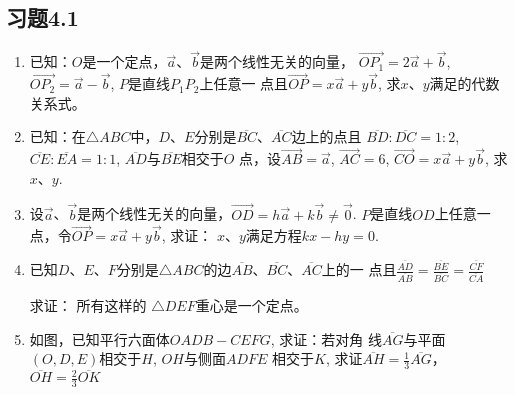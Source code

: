 \subsection*{习题4.1}

\begin{enumerate}
    \item 已知：$O$是一个定点，$\vec{a}$、$\vec{b}$是两个线性无关的向量，
$\Vec{OP_1}=2\vec{a}+\vec{b}$, $\Vec{OP_2}=\vec{a}-\vec{b}$, $P$是直线$P_1P_2$上任意一
    点且$\Vec{OP}=x\vec{a}+y\vec{b}$, 求$x$、$y$满足的代数关系式。
    \item 已知：在$\triangle ABC$中，$D$、$E$分别是$\overline{BC}$、$\overline{AC}$边上的点且
    $\overline{BD}:\overline{DC}=1:2$, $\overline{CE}:\overline{EA}=1:1$, $\overline{AD}$与$\overline{BE}$相交于$O$
    点，设$\Vec{AB}=\vec{a}$, $\Vec{AC}=6$, $\Vec{CO}=x\vec{a}+y\vec{b}$, 求$x$、$y$.
    \item 设$\vec{a}$、$\vec{b}$是两个线性无关的向量，$\Vec{OD}=h\vec{a}+k\vec{b}\ne \vec{0}$.
    $P$是直线$OD$上任意一点，令$\Vec{OP}=x\vec{a}+y\vec{b}$, 求证：
    $x$、$y$满足方程$kx-hy=0$.
    \item 已知$D$、$E$、$F$分别是$\triangle ABC$的边$\overline{AB}$、$\overline{BC}$、$\overline{AC}$上的一
    点且$\frac{\overline{AD}}{\overline{AB}}=\frac{\overline{BE}}{\overline{BC}}=\frac{\overline{CF}}{\overline{CA}}$

    求证：
    所有这样的
    $\triangle DEF$重心是一个定点。

\item 如图，已知平行六面体$OADB-CEFG$, 求证：若对角
线$\overline{AG}$与平面$(O,D,E)$相交于$H$, $OH$与侧面$ADFE$
相交于$K$, 求证$\overline{AH}=\frac{1}{3}\overline{AG}$，$\overline{OH}=\frac{2}{3}\overline{OK}$

\begin{figure}[htp]\centering
    \begin{minipage}[t]{0.48\textwidth}
    \centering
{}
\end{minipage}
\end{figure}
\end{enumerate}
